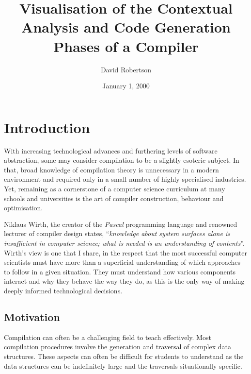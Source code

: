 \documentclass{l4proj}
\begin{document}
\title{Visualisation of the Contextual Analysis and Code Generation Phases of a Compiler}
\author{David Robertson}
\date{January 1, 2000}
\maketitle

\begin{abstract}

\end{abstract}

\educationalconsent
%
%
\tableofcontents

\chapter{Introduction}
With increasing technological advances and furthering levels of software abstraction, some may consider compilation to be a slightly esoteric subject. In that, broad knowledge of compilation theory is unnecessary in a modern environment and required only in a small number of highly specialised industries. Yet, remaining as a cornerstone of a computer science curriculum at many schools and universities is the art of compiler construction, behaviour and optimisation.

Niklaus Wirth, the creator of the \textit{Pascal} programming language and renowned lecturer of compiler design states, ``\textit{knowledge about system surfaces alone is insufficient in computer science; what is needed is an understanding of contents}''. Wirth's view is one that I share, in the respect that the most successful computer scientists must have more than a superficial understanding of which approaches to follow in a given situation. They must understand how various components interact and why they behave the way they do, as this is the only way of making deeply informed technological decisions.

\section{Motivation}
Compilation can often be a challenging field to teach effectively. Most compilation procedures involve the generation and traversal of complex data structures. These aspects can often be difficult for students to understand as the data structures can be indefinitely large and the traversals situationally specific. 
\end{document}
